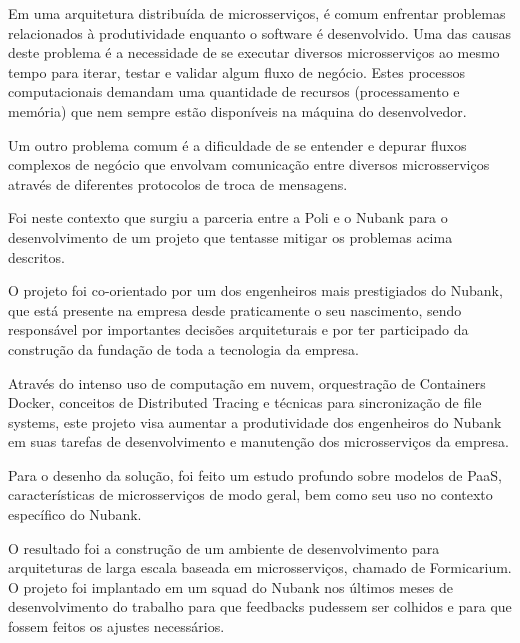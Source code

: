 \documentclass[twosideprint]{politex}
\begin{document}
\begin{resumo}
	Em uma arquitetura distribuída de microsserviços, é comum enfrentar problemas relacionados à produtividade enquanto o software é desenvolvido. Uma das causas deste problema é a necessidade de se executar diversos microsserviços ao mesmo tempo para iterar, testar e validar algum fluxo de negócio. Estes processos computacionais demandam uma quantidade de recursos (processamento e memória) que nem sempre estão disponíveis na máquina do desenvolvedor.
	
	Um outro problema comum é a dificuldade de se entender e depurar fluxos complexos de negócio que envolvam comunicação entre diversos microsserviços através de diferentes protocolos de troca de mensagens.
	
	Foi neste contexto que surgiu a parceria entre a Poli e o Nubank para o desenvolvimento de um projeto que tentasse mitigar os problemas acima descritos.
	
	
	O projeto foi co-orientado por um dos engenheiros mais prestigiados do Nubank, que está presente na empresa desde praticamente o seu nascimento, sendo responsável por importantes decisões arquiteturais e por ter participado da construção da fundação de toda a tecnologia da empresa.
	
	Através do intenso uso de computação em nuvem, orquestração de Containers Docker, conceitos de Distributed Tracing e técnicas para sincronização de file systems, este projeto visa aumentar a produtividade dos engenheiros do Nubank em suas tarefas de desenvolvimento e manutenção dos microsserviços da empresa.
	
	Para o desenho da solução, foi feito um estudo profundo sobre modelos de PaaS, características de microsserviços de modo geral, bem como seu uso no contexto específico do Nubank. 
	
	O resultado foi a construção de um ambiente de desenvolvimento para arquiteturas de larga escala baseada em microsserviços, chamado de Formicarium. O projeto foi implantado em um squad do Nubank nos últimos meses de desenvolvimento do trabalho para que feedbacks pudessem ser colhidos e para que fossem feitos os ajustes necessários.
	

\end{resumo}
\end{document}
